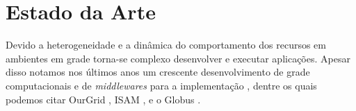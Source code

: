 \section{Estado da Arte}
\label{cap:estado da arte}

Devido a heterogeneidade e a dinâmica do comportamento dos recursos em ambientes em grade torna-se complexo desenvolver e executar aplicações. Apesar disso notamos nos últimos anos um crescente desenvolvimento de grade computacionais e de \emph{middlewares} para a implementação \cite{Silva}, \cite{Santos} dentre os quais podemos citar OurGrid \cite{Silva}, ISAM \cite{Jr.2002}, \cite{Nino2006} e o Globus \cite{Foster1998}.


